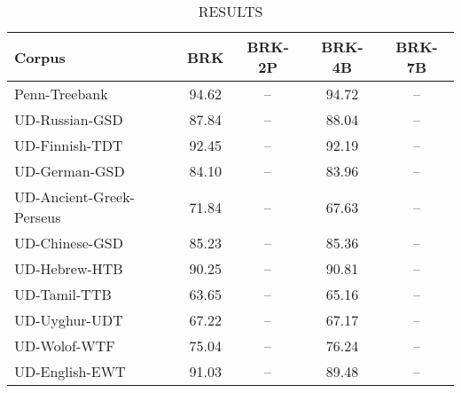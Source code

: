 \begin{table}[h]
\centering
\caption{RESULTS}
\label{tab:my_table}

\begin{tabular}{|l|c|c|c|c|}
\hline
\textbf{Corpus}                & \textbf{BRK} & \textbf{BRK-2P} & \textbf{BRK-4B} & \textbf{BRK-7B} \\ 
\hline
Penn-Treebank                  & 94.62        & --              & 94.72           & --              \\
UD-Russian-GSD                 & 87.84        & --              & 88.04           & --              \\
UD-Finnish-TDT                 & 92.45        & --              & 92.19           & --              \\
UD-German-GSD                  & 84.10        & --              & 83.96           & --              \\
UD-Ancient-Greek-Perseus       & 71.84        & --              & 67.63           & --              \\
UD-Chinese-GSD                 & 85.23        & --              & 85.36           & --              \\
UD-Hebrew-HTB                  & 90.25        & --              & 90.81           & --              \\  
UD-Tamil-TTB                   & 63.65        & --              & 65.16           & --              \\
UD-Uyghur-UDT                  & 67.22        & --              & 67.17           & --              \\
UD-Wolof-WTF                   & 75.04        & --              & 76.24           & --              \\
UD-English-EWT                 & 91.03        & --              & 89.48           & --              \\
\hline

\end{tabular}
\end{table}
